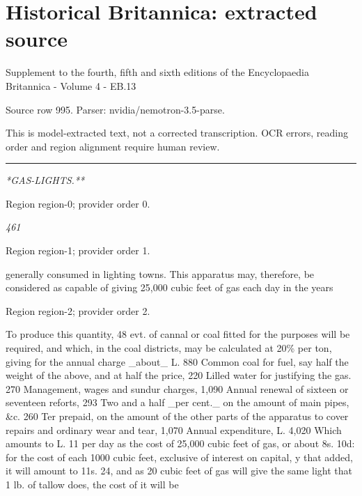 \documentclass[11pt]{article}
\begin{document}
\section*{Historical Britannica: extracted source}
Supplement to the fourth, fifth and sixth editions of the Encyclopaedia Britannica - Volume 4 - EB.13\par
{\small Source row 995. Parser: nvidia/nemotron-3.5-parse.\par}
{\small This is model-extracted text, not a corrected transcription. OCR errors, reading order and region alignment require human review.\par}
\hrule\medskip
{\small\itshape **GAS-LIGHTS.**\par}

{\scriptsize\color{gray} Region region-0; provider order 0.\par}
\medskip

{\small\itshape 461\par}

{\scriptsize\color{gray} Region region-1; provider order 1.\par}
\medskip

generally consumed in lighting towns. This apparatus may, therefore, be considered as capable of giving 25,000 cubic feet of gas each day in the years
\par

{\scriptsize\color{gray} Region region-2; provider order 2.\par}
\medskip

To produce this quantity, 48 evt. of cannal or coal fitted for the purposes will be required, and which, in the coal districts, may be calculated at 20\% per ton, giving for the annual charge \_about\_ L. 880 Common coal for fuel, say half the weight of the above, and at half the price, 220 Lilled water for justifying the gas. 270 Management, wages and sundur charges, 1,090 Annual renewal of sixteen or seventeen reforts, 293 Two and a half \_per cent.\_ on the amount of main pipes, \&c. 260 Ter prepaid, on the amount of the other parts of the apparatus to cover repairs and ordinary wear and tear, 1,070 Annual expenditure, L. 4,020 Which amounts to L. 11 per day as the cost of 25,000 cubic feet of gas, or about 8s. 10d: for the cost of each 1000 cubic feet, exclusive of interest on capital, y that added, it will amount to 11s. 24, and as 20 cubic feet of gas will give the same light that 1 lb. of tallow does, the cost of it will be
\par
\end{document}
